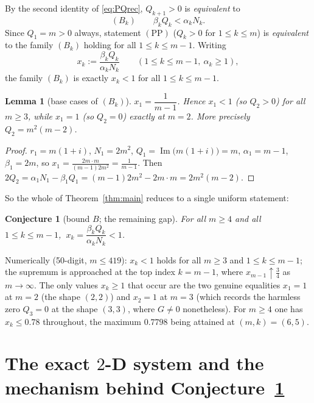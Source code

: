 \documentclass[11pt]{article}
\newtheorem{lemma}{Lemma}
\newtheorem{conjecture}{Conjecture}
\theoremstyle{definition}
\renewcommand{\Im}{\operatorname{Im}}
\begin{document}
By the second identity of \eqref{eq:PQrec}, $Q_{k+1}>0$ is \emph{equivalent} to
\begin{equation}\label{eq:Bk}
  (B_k)\qquad \beta_k Q_k<\alpha_k N_k .
\end{equation}
Since $Q_1=m>0$ always, statement $(\mathrm{PP})$ ($Q_k>0$ for $1\le k\le m$) is
\emph{equivalent} to the family $(B_k)$ holding for all $1\le k\le m-1$.  Writing
\[
  x_k:=\frac{\beta_kQ_k}{\alpha_kN_k}\qquad(1\le k\le m-1,\ \alpha_k\ge1),
\]
the family $(B_k)$ is exactly $x_k<1$ for all $1\le k\le m-1$.

\begin{lemma}[base cases of $(B_k)$]\label{lem:base}
$x_1=\dfrac{1}{m-1}$.  Hence $x_1<1$ (so $Q_2>0$) for all $m\ge3$, while
$x_1=1$ (so $Q_2=0$) exactly at $m=2$.  More precisely $Q_2=m^2(m-2)$.
\end{lemma}
\begin{proof}
$r_1=m(1+i)$, $N_1=2m^2$, $Q_1=\Im\big(m(1+i)\big)=m$, $\alpha_1=m-1$,
$\beta_1=2m$, so $x_1=\frac{2m\cdot m}{(m-1)2m^2}=\frac1{m-1}$.  Then
$2Q_2=\alpha_1N_1-\beta_1Q_1=(m-1)2m^2-2m\cdot m=2m^2(m-2)$.
\end{proof}

So the whole of Theorem~\ref{thm:main} reduces to a single uniform statement:

\begin{conjecture}[bound $B$; the remaining gap]\label{conj:B}
For all $m\ge4$ and all $1\le k\le m-1$, $\ x_k=\dfrac{\beta_kQ_k}{\alpha_kN_k}<1$.
\end{conjecture}

Numerically (50-digit, $m\le419$): $x_k<1$ holds for all $m\ge3$ and
$1\le k\le m-1$; the supremum is approached at the top index $k=m-1$, where
$x_{m-1}\uparrow\frac34$ as $m\to\infty$.  The only values $x_k\ge1$ that occur are
the two genuine equalities $x_1=1$ at $m=2$ (the shape $(2,2)$) and
$x_2=1$ at $m=3$ (which records the harmless zero $Q_3=0$ at the shape $(3,3)$,
where $G\neq0$ nonetheless).  For $m\ge4$ one has $x_k\le 0.78$ throughout, the
maximum $0.7798$ being attained at $(m,k)=(6,5)$.

\section{The exact $2$-D system and the mechanism behind Conjecture~\ref{conj:B}}
\end{document}
